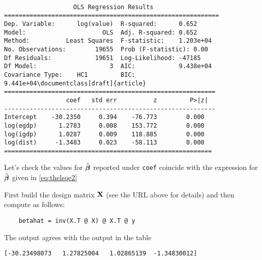 \begin{frame}[fragile]
%
\small\begin{verbatim}

                   OLS Regression Results                            
===========================================================
Dep. Variable:      log(value)  R-squared:      0.652
Model:                     OLS  Adj. R-squared: 0.652
Method:          Least Squares  F-statistic:    1.203e+04
No. Observations:        19655  Prob (F-statistic): 0.00
Df Residuals:            19651  Log-Likelihood: -47185
Df Model:                    3  AIC:            9.438e+04
Covariance Type:    HC1         BIC:            9.441e+04\documentclass[draft]{article}                                    
==========================================================
                 coef   std err          z         P>|z|   
----------------------------------------------------------
Intercept    -30.2350     0.394    -76.773        0.000   
log(egdp)      1.2783     0.008    153.772        0.000    
log(igdp)      1.0287     0.009    118.885        0.000    
log(dist)     -1.3483     0.023    -58.113        0.000   
=========================================================

\end{verbatim}
%
\end{frame}

\begin{frame}[fragile]

    \vspace{2em}
    Let's check the values for $\hat {\boldsymbol \beta}$ reported under \texttt{coef}
    coincide with the expression for $\hat {\boldsymbol \beta}$ given in \eqref{eq:thelsqe2}\
    
    \vspace{.7em}
    First build the design matrix $\mathbf X$ (see the URL above for details)
    and then compute as follows:
    
    \begin{verbatim}
    betahat = inv(X.T @ X) @ X.T @ y
    \end{verbatim}
    
    The output agrees with the output in the table

    \begin{verbatim}
[-30.23498073   1.27825004   1.02865139  -1.34830012]    
    \end{verbatim}
    
\end{frame}

